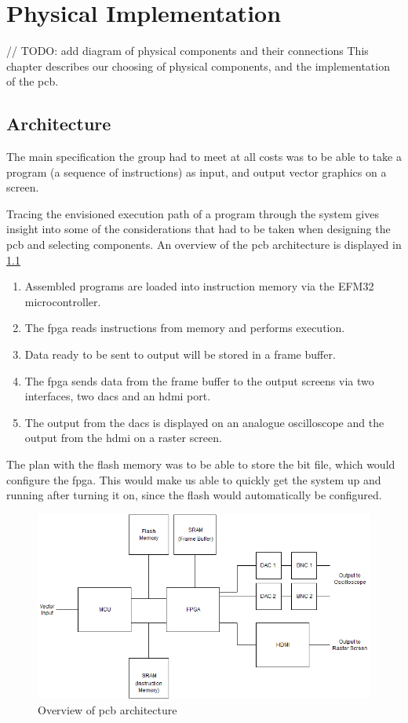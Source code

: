 \chapter{Physical Implementation}

// TODO: add diagram of physical components and their connections
This chapter describes our choosing of physical components, and the implementation of the \gls{pcb}.

\section{Architecture}
The main specification the group had to meet at all costs was to be able to take a program (a sequence of instructions) as input, and output vector graphics on a screen.

Tracing the envisioned execution path of a program through the system gives insight into some of the considerations that had to be taken when designing the \gls{pcb} and selecting components. An overview of the \gls{pcb} architecture is displayed in \ref{fig:PCB_Overview}

\begin{enumerate}
\item Assembled \vthreek programs are loaded into instruction memory via the EFM32 microcontroller.
\item The \gls{fpga} reads instructions from memory and performs execution.
\item Data ready to be sent to output will be stored in a frame buffer.
\item The \gls{fpga} sends data from the frame buffer to the output screens via two interfaces, two \gls{dac}s and an \gls{hdmi} port.
\item The output from the \gls{dac}s is displayed on an analogue oscilloscope and the output from the \gls{hdmi} on a raster screen.
\end{enumerate}

The plan with the flash memory was to be able to store the bit file, which would configure the \gls{fpga}. This would make us able to quickly get the system up and running after turning it on, since the flash would automatically be configured.

\begin{figure}[h!]
\centering
\includegraphics[scale = 0.4]{images/PCB_Overview.png}
\caption{Overview of \gls{pcb} architecture}
\label{fig:PCB_Overview}
\end{figure}

